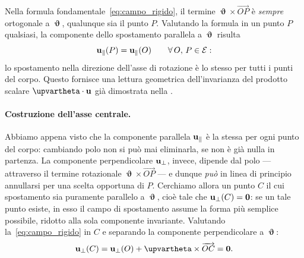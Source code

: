 Nella formula fondamentale~\eqref{eq:campo_rigido}, il termine
$\bm{\upvartheta} \times \overrightarrow{OP}$ è \textit{sempre}
ortogonale a $\bm{\upvartheta}$, qualunque sia il punto $P$.
Valutando la formula in un punto $P$ qualsiasi, la componente
dello spostamento parallela a $\bm{\upvartheta}$ risulta
\begin{equation}
	\mathbf{u}_{\parallel}(P) = \mathbf{u}_{\parallel}(O)
	\qquad \forall\, O,\, P \in \mathcal{E}:
\end{equation}
lo spostamento nella direzione dell'asse di rotazione è lo
stesso per tutti i punti del corpo. Questo fornisce una lettura
geometrica dell'invarianza del prodotto scalare
$\bm{\upvartheta} \cdot \ub$ già dimostrata nella
.


\paragraph{Costruzione dell'asse centrale.}
Abbiamo appena visto che la componente parallela $\mathbf{u}_\parallel$ è la stessa per ogni punto del corpo: cambiando polo non si può mai eliminarla, se non è già nulla in partenza. La componente perpendicolare $\mathbf{u}_\perp$, invece, dipende dal polo — attraverso il termine rotazionale $\bm{\upvartheta}\times\overrightarrow{OP}$ — e dunque \emph{può} in linea di principio annullarsi per una scelta opportuna di $P$. Cerchiamo allora un punto $C$ il cui spostamento sia puramente
parallelo a $\bm{\upvartheta}$, cioè tale che
$\mathbf{u}_{\perp}(C) = \mathbf 0$: se un tale punto esiste, in esso il campo di spostamento assume la forma più semplice possibile, ridotto alla sola componente invariante. Valutando la~\eqref{eq:campo_rigido} in
$C$ e separando la componente perpendicolare a
$\bm{\upvartheta}$:
\begin{equation}\label{eq:cond_annull_cin}
	\ub_{\perp}(C)
	= \ub_{\perp}(O)
	+ \bm{\upvartheta} \times \overrightarrow{OC}
	= \mathbf 0.
\end{equation}


